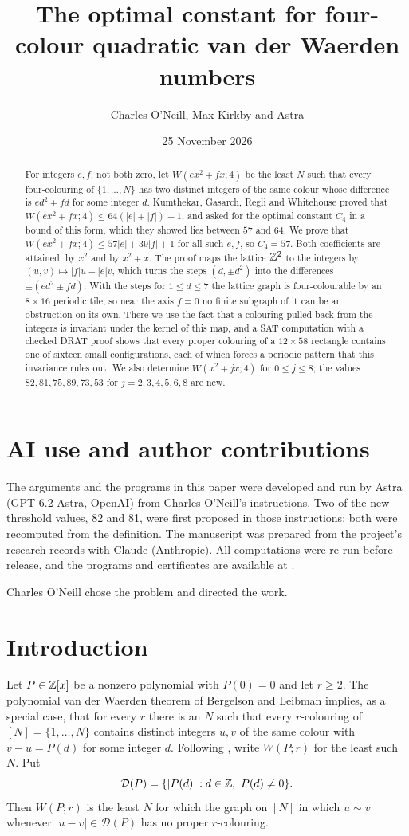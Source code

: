\documentclass[11pt,colorlinks]{charlie}
\title{The optimal constant for four-colour quadratic van der Waerden numbers}
\author{Charles O'Neill, Max Kirkby and Astra}
\date{25 November 2026}
\newcommand{\D}{\mathcal D}
\renewcommand{\aiusestatement}{The arguments and the programs in this paper were developed and run by Astra (GPT-6.2 Astra, OpenAI) from Charles O'Neill's instructions. Two of the new threshold values, 82 and 81, were first proposed in those instructions; both were recomputed from the definition. The manuscript was prepared from the project's research records with Claude (Anthropic). All computations were re-run before release, and the programs and certificates are available at \coderepo.}
\begin{document}
\maketitle

\begin{abstract}
For integers $e,f$, not both zero, let $W(ex^2+fx;4)$ be the least $N$ such that every four-colouring of $\{1,\dots,N\}$ has two distinct integers of the same colour whose difference is $ed^2+fd$ for some integer $d$. Kumthekar, Gasarch, Regli and Whitehouse proved that $W(ex^2+fx;4)\le64(|e|+|f|)+1$, and asked for the optimal constant $C_4$ in a bound of this form, which they showed lies between $57$ and $64$. We prove that $W(ex^2+fx;4)\le57|e|+39|f|+1$ for all such $e,f$, so $C_4=57$. Both coefficients are attained, by $x^2$ and by $x^2+x$. The proof maps the lattice $\mathbb{Z}^2$ to the integers by $(u,v)\mapsto|f|u+|e|v$, which turns the steps $(d,\pm d^2)$ into the differences $\pm(ed^2\pm fd)$. With the steps for $1\le d\le7$ the lattice graph is four-colourable by an $8\times16$ periodic tile, so near the axis $f=0$ no finite subgraph of it can be an obstruction on its own. There we use the fact that a colouring pulled back from the integers is invariant under the kernel of this map, and a SAT computation with a checked DRAT proof shows that every proper colouring of a $12\times58$ rectangle contains one of sixteen small configurations, each of which forces a periodic pattern that this invariance rules out. We also determine $W(x^2+jx;4)$ for $0\le j\le8$; the values $82,81,75,89,73,53$ for $j=2,3,4,5,6,8$ are new.
\end{abstract}

\section*{AI use and author contributions}
\aiusestatement

Charles O'Neill chose the problem and directed the work. \responsibilitystatement

\section{Introduction}

Let $P\in\mathbb{Z}[x]$ be a nonzero polynomial with $P(0)=0$ and let $r\ge2$. The polynomial van der Waerden theorem of Bergelson and Leibman \cite{BL} implies, as a special case, that for every $r$ there is an $N$ such that every $r$-colouring of $[N]=\{1,\dots,N\}$ contains distinct integers $u,v$ of the same colour with $v-u=P(d)$ for some integer $d$. Following \cite{KGRW}, write $W(P;r)$ for the least such $N$. Put
\[
\D(P)=\{|P(d)|:d\in\Z,\ P(d)\ne0\}.
\]
Then $W(P;r)$ is the least $N$ for which the graph on $[N]$ in which $u\sim v$ whenever $|u-v|\in\D(P)$ has no proper $r$-colouring.
\end{document}
